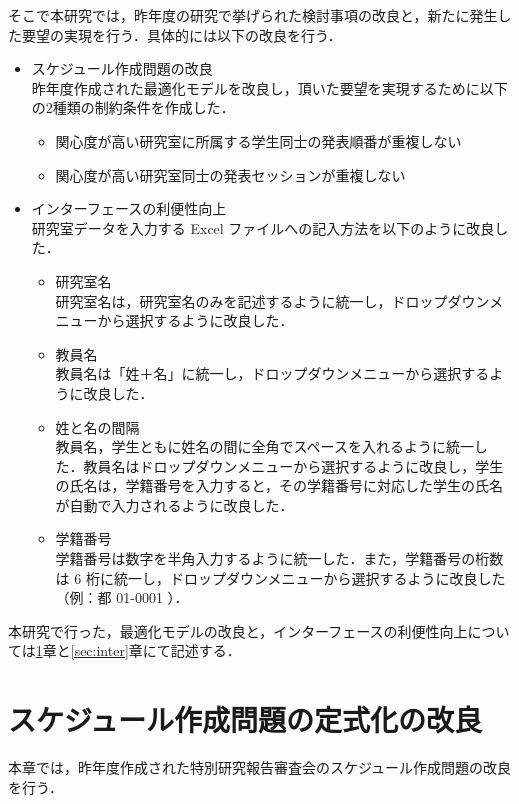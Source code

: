 \documentclass[a4paper,12pt,fleqn]{jarticle}
\begin{document}
そこで本研究では，昨年度の研究で挙げられた検討事項の改良と，新たに発生した要望の実現を行う．具体的には以下の改良を行う．
\begin{itemize}
\item スケジュール作成問題の改良\\
昨年度作成された最適化モデルを改良し，頂いた要望を実現するために以下の$2$種類の制約条件を作成した．
\begin{itemize}
\item 関心度が高い研究室に所属する学生同士の発表順番が重複しない
\item 関心度が高い研究室同士の発表セッションが重複しない
\end{itemize}
\item インターフェースの利便性向上\\
研究室データを入力する Excel ファイルへの記入方法を以下のように改良した．
\begin{itemize}
\item 研究室名\\
研究室名は，研究室名のみを記述するように統一し，ドロップダウンメニューから選択するように改良した．
\item 教員名\\
教員名は「姓＋名」に統一し，ドロップダウンメニューから選択するように改良した．
\item 姓と名の間隔\\
教員名，学生ともに姓名の間に全角でスペースを入れるように統一した．教員名はドロップダウンメニューから選択するように改良し，学生の氏名は，学籍番号を入力すると，その学籍番号に対応した学生の氏名が自動で入力されるように改良した．
\item 学籍番号\\
学籍番号は数字を半角入力するように統一した．また，学籍番号の桁数は $6$ 桁に統一し，ドロップダウンメニューから選択するように改良した（例：都 01-0001 ）．
\end{itemize}
\end{itemize}

本研究で行った，最適化モデルの改良と，インターフェースの利便性向上については\ref{sec:model4}章と\ref{sec:inter}章にて記述する．
\newpage
\section{スケジュール作成問題の定式化の改良}\label{sec:model4}
本章では，昨年度作成された特別研究報告審査会のスケジュール作成問題の改良を行う．
\end{document}
